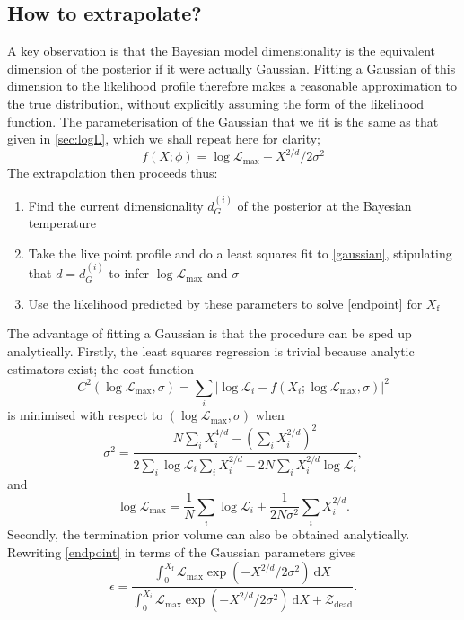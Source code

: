 \documentclass[usenatbib]{mnras}
\newcommand{\Like}{\mathcal{L}}
\newcommand{\logLmax}{\log \Like_\mathrm{max}}
\begin{document}
\subsection{How to extrapolate?}
A key observation is that the Bayesian model dimensionality is the equivalent dimension of the posterior if it were actually Gaussian. Fitting a Gaussian of this dimension to the likelihood profile therefore makes a reasonable approximation to the true distribution, without explicitly assuming the form of the likelihood function. The parameterisation of the Gaussian that we fit is the same as that given in \cref{sec:logL}, which we shall repeat here for clarity;
\begin{equation}\label{gaussian}
    f(X; \phi) = \logLmax - X^{2/d}/2\sigma^2
\end{equation}
The extrapolation then proceeds thus:
\begin{enumerate}[leftmargin=*]
    \item Find the current dimensionality ${d}^{(i)}_G$ of the posterior at the Bayesian temperature
    \item Take the live point profile and do a least squares fit to \eqref{gaussian}, stipulating that $d = {d}^{(i)}_G$ to infer $\logLmax$ and $\sigma$ 
    \item Use the likelihood predicted by these parameters to solve \eqref{endpoint} for $X_\mathrm{f}$
\end{enumerate}
The advantage of fitting a Gaussian is that the procedure can be sped up analytically. Firstly, the least squares regression is trivial because analytic estimators exist; the cost function 
\begin{equation}\label{chi squared}
	C^2(\logLmax, \sigma) = \sum_i \left| \log \Like_i - f(X_i; \logLmax, \sigma) \right| ^2
\end{equation}
is minimised with respect to $(\logLmax, \sigma)$ when
\begin{equation}\label{eq:sigma}
    \sigma^2 = \frac{N \sum_i X_i^{4/d} - \left(\sum_i X_i^{2/d}\right)^2}{2 \sum_i \log \Like_i \sum_i X_i^{2/d} - 2N \sum_i X_i^{2/d}\log \Like_i },
\end{equation}
and
\begin{equation}\label{eq:logLmax}
    \logLmax = \frac{1}{N} \sum_i \log \mathcal{L}_i + \frac{1}{2N\sigma^2} \sum_i X_i^{2/d}.
\end{equation}
Secondly, the termination prior volume can also be obtained analytically. Rewriting \cref{endpoint} in terms of the Gaussian parameters gives
\begin{equation}
	\epsilon = \frac{\int_0^{X_\mathrm{f}} \Like_\mathrm{max} \exp\left(-X^{2/d}/2\sigma^2\right)\ \mathrm{d}X}{\int_0^{X_i} \Like_\mathrm{max} \exp\left(-X^{2/d}/2\sigma^2\right)\ \mathrm{d}X + \mathcal{Z}_\mathrm{dead}}.
\end{equation}
\end{document}
